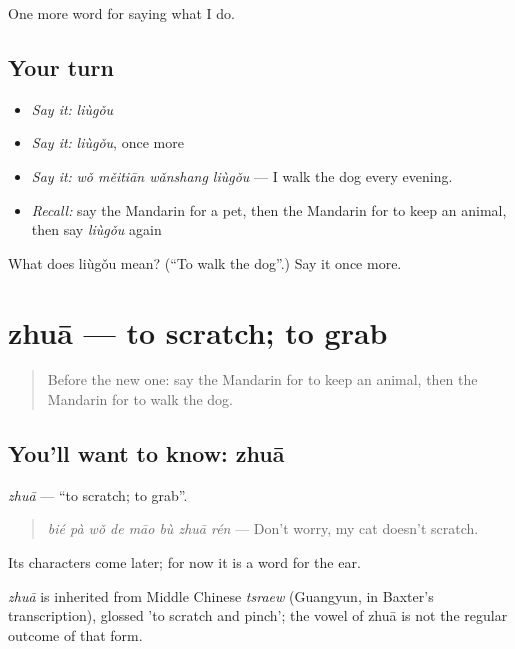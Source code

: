 \begin{grammarlens}[title={What you've built}]
One more word for saying what I do.
\end{grammarlens}

\subsection*{Your turn}
\begin{itemize}
\raggedright
  \item \emph{Say it:} \emph{liùgǒu}
  \item \emph{Say it:} \emph{liùgǒu}, once more
  \item \emph{Say it:} \emph{wǒ měitiān wǎnshang liùgǒu} — I walk the dog every evening.
  \item \emph{Recall:} say the Mandarin for a pet, then the Mandarin for to keep an animal, then say \emph{liùgǒu} again
\end{itemize}

\begin{tcolorbox}[breakable,colback=teal!4,colframe=teal!35!black,title={Before you move on}]
What does liùgǒu mean? (\textquotedblleft{}To walk the dog\textquotedblright{}.) Say it once more.
\end{tcolorbox}
\section[zhuā]{zhuā — to scratch; to grab}

\label{lesson:ZH-C229-zhua}



\begin{quote}
Before the new one: say the Mandarin for to keep an animal, then the Mandarin for to walk the dog.
\end{quote}

\subsection*{You'll want to know: zhuā}
\emph{zhuā} — \textquotedblleft{}to scratch; to grab\textquotedblright{}.

\begin{quote}
\emph{bié pà wǒ de māo bù zhuā rén} — Don't worry, my cat doesn't scratch.
\end{quote}

Its characters come later; for now it is a word for the ear.

\begin{cousinweb}
\emph{zhuā} is inherited from Middle Chinese \emph{tsraew} (Guangyun, in Baxter's transcription), glossed 'to scratch and pinch'; the vowel of zhuā is not the regular outcome of that form.
\end{cousinweb}

